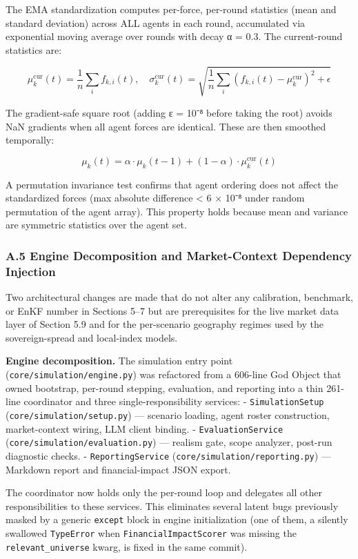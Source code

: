 \documentclass[
]{article}
\begin{document}
The EMA standardization computes per-force, per-round statistics (mean
and standard deviation) across ALL agents in each round, accumulated via
exponential moving average over rounds with decay α = 0.3. The
current-round statistics are:

\[\mu_k^{\text{cur}}(t) = \frac{1}{n}\sum_i f_{k,i}(t), \quad \sigma_k^{\text{cur}}(t) = \sqrt{\frac{1}{n}\sum_i (f_{k,i}(t) - \mu_k^{\text{cur}})^2 + \epsilon}\]

The gradient-safe square root (adding ε = 10⁻⁸ before taking the root)
avoids NaN gradients when all agent forces are identical. These are then
smoothed temporally:

\[\mu_k(t) = \alpha \cdot \mu_k(t-1) + (1-\alpha) \cdot \mu_k^{\text{cur}}(t)\]

A permutation invariance test confirms that agent ordering does not
affect the standardized forces (max absolute difference \textless{} 6 ×
10⁻⁸ under random permutation of the agent array). This property holds
because mean and variance are symmetric statistics over the agent set.

\subsubsection{A.5 Engine Decomposition and Market-Context Dependency
Injection}\label{a.5-engine-decomposition-and-market-context-dependency-injection}

Two architectural changes are made that do not alter any
calibration, benchmark, or EnKF number in Sections 5--7 but are
prerequisites for the live market data layer of Section 5.9 and for the
per-scenario geography regimes used by the sovereign-spread and
local-index models.

\textbf{Engine decomposition.} The simulation entry point
(\texttt{core/simulation/engine.py}) was refactored from a 606-line God
Object that owned bootstrap, per-round stepping, evaluation, and
reporting into a thin 261-line coordinator and three
single-responsibility services: - \texttt{SimulationSetup}
(\texttt{core/simulation/setup.py}) --- scenario loading, agent roster
construction, market-context wiring, LLM client binding. -
\texttt{EvaluationService} (\texttt{core/simulation/evaluation.py}) ---
realism gate, scope analyzer, post-run diagnostic checks. -
\texttt{ReportingService} (\texttt{core/simulation/reporting.py}) ---
Markdown report and financial-impact JSON export.

The coordinator now holds only the per-round loop and delegates all
other responsibilities to these services. This eliminates several latent
bugs previously masked by a generic \texttt{except} block in engine
initialization (one of them, a silently swallowed \texttt{TypeError}
when \texttt{FinancialImpactScorer} was missing the
\texttt{relevant\_universe} kwarg, is fixed in the same commit).
\end{document}
